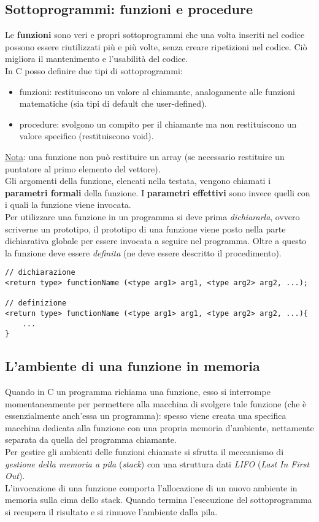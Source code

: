 \subsection{Sottoprogrammi: funzioni e procedure}
Le \textbf{funzioni} sono veri e propri sottoprogrammi che una volta inseriti nel codice possono essere riutilizzati più e più volte, senza creare ripetizioni nel codice. Ciò migliora il mantenimento e l'usabilità del codice.\\
In C posso definire due tipi di sottoprogrammi: 
\begin{itemize}
	\item funzioni: restituiscono un valore al chiamante, analogamente alle funzioni matematiche (sia tipi di default che user-defined).
	\item procedure: svolgono un compito per il chiamante ma non restituiscono un valore specifico (restituiscono \colorbox{light-gray}{void}).
\end{itemize}
\underline{Nota}: una funzione non può restituire un array (se necessario restituire un puntatore al primo elemento del vettore).\\
Gli argomenti della funzione, elencati nella testata, vengono chiamati i \textbf{parametri formali} della funzione. I \textbf{parametri effettivi} sono invece quelli con i quali la funzione viene invocata.\\
Per utilizzare una funzione in un programma si deve prima \textit{dichiararla}, ovvero scriverne un prototipo, il prototipo di una funzione viene posto nella parte dichiarativa globale per essere invocata a seguire nel programma. Oltre a questo la funzione deve essere \textit{definita} (ne deve essere descritto il procedimento).  
\begin{lstlisting}[title={Dichiarazione di una funzione}]
// dichiarazione
<return type> functionName (<type arg1> arg1, <type arg2> arg2, ...);

// definizione
<return type> functionName (<type arg1> arg1, <type arg2> arg2, ...){
    ...
}
\end{lstlisting}

\subsection{L'ambiente di una funzione in memoria}
Quando in C un programma richiama una funzione, esso si interrompe momentaneamente per permettere alla macchina di svolgere tale funzione (che è essenzialmente anch’essa un programma): spesso viene creata una specifica macchina dedicata alla funzione con una propria memoria d'ambiente, nettamente separata da quella del programma chiamante.\\
Per gestire gli ambienti delle funzioni chiamate si sfrutta il meccanismo di \textit{gestione della memoria a pila} (\textit{stack}) con una struttura dati \textit{LIFO} (\textit{Last In First Out}).\\ L’invocazione di una funzione comporta l’allocazione di un nuovo ambiente in memoria sulla cima dello stack. Quando termina l’esecuzione del sottoprogramma si recupera il risultato e si rimuove l'ambiente dalla pila.

